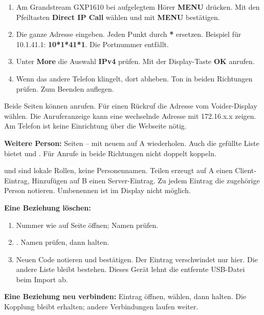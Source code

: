 \emergency
{}
\begin{enumerate}
\item Am Grandstream GXP1610 bei aufgelegtem Hörer \textbf{MENU} drücken. Mit den Pfeiltasten \textbf{Direct IP Call} wählen und mit \textbf{MENU} bestätigen.
\item Die ganze Adresse eingeben. Jeden Punkt durch \textbf{*} ersetzen. Beispiel für 10.1.41.1: \textbf{10*1*41*1}. Die Portnummer entfällt.
\item Unter \textbf{More} die Auswahl \textbf{IPv4} prüfen. Mit der Display-Taste \textbf{OK} anrufen.
\item Wenn das andere Telefon klingelt, dort abheben. Ton in beiden Richtungen prüfen. Zum Beenden auflegen.
\end{enumerate}
Beide Seiten können anrufen. Für einen Rückruf die Adresse vom Voider-Display wählen. Die Anruferanzeige kann eine wechselnde Adresse mit 172.16.x.x zeigen. Am Telefon ist keine Einrichtung über die Webseite nötig.

\textbf{Weitere Person:} Seiten \pageref{de:share}–\pageref{de:add} mit neuem  auf A wiederholen. Auch die gefüllte Liste bietet  und . Für Anrufe in beide Richtungen nicht doppelt koppeln.

 und  sind lokale Rollen, keine Personennamen. Teilen erzeugt auf A einen Client-Eintrag, Hinzufügen auf B einen Server-Eintrag. Zu jedem Eintrag die zugehörige Person notieren. Umbenennen ist im Display nicht möglich.

\textbf{Eine Beziehung löschen:}
\begin{enumerate}
\item Nummer wie auf Seite \pageref{de:find} öffnen; Namen prüfen.
\item {} \arr {}. Namen prüfen, dann  halten.
\item Neuen Code notieren und bestätigen. Der Eintrag verschwindet nur hier. Die andere Liste bleibt bestehen. Dieses Gerät lehnt die entfernte USB-Datei beim Import ab.
\end{enumerate}

\textbf{Eine Beziehung neu verbinden:} Eintrag öffnen,  \arr {} wählen, dann  halten. Die Kopplung bleibt erhalten; andere Verbindungen laufen weiter.

